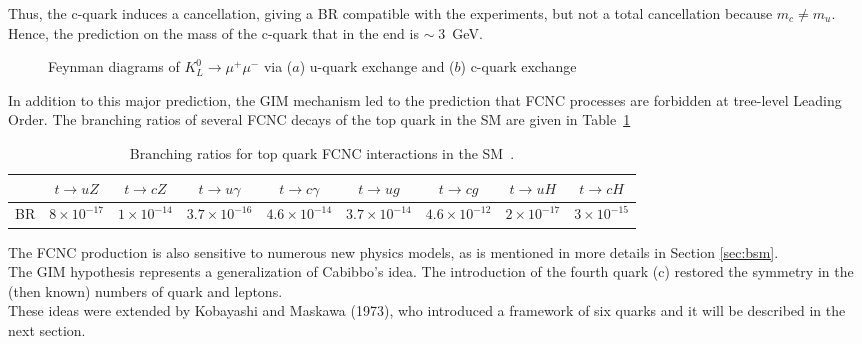 Thus, the c-quark induces a cancellation, giving a BR compatible with the experiments, but not a total cancellation because $m_{c}\neq m_{u}$. Hence, the prediction on the mass of the
c-quark that in the end is $\sim\; 3$~GeV.
\begin{figure}[h]
	\centering
		\qquad
	\caption{Feynman diagrams of $K^{0}_{L}\rightarrow \mu^{+} \mu^{-}$ via ($a$) u-quark exchange and ($b$) c-quark exchange}
\end{figure}
In addition to this major prediction, the GIM mechanism led to the prediction that FCNC processes are forbidden at tree-level Leading Order. The branching ratios of several FCNC decays of the top quark in the SM are given in Table~\ref{tab:SM_BR}
\begin{table}[h]
	\begin{adjustbox}{max width=1.\textwidth,center}
		\begin{tabular}{|c|c|c|c|c|c|c|c|c|}
		\hline 
  & $ t\rightarrow uZ$    & $ t\rightarrow cZ$    & $ t\rightarrow u\gamma$ & $ t\rightarrow c\gamma$ & $ t\rightarrow ug$       & $ t\rightarrow cg$       & $ t\rightarrow uH$     & $ t\rightarrow cH$  \\ 
	\hline 
	BR & $8\times 10^{-17} $ & $1\times 10^{-14} $ & $3.7\times 10^{-16} $       & $4.6\times 10^{-14} $      & $3.7\times 10^{-14} $  & $4.6\times 10^{-12} $ & $2\times 10^{-17} $  &$3\times 10^{-15} $  \\ 
		\hline 
		\end{tabular} 
	\end{adjustbox}
\caption{Branching ratios for top quark FCNC interactions in the SM~\cite{aguilar}.}
\label{tab:SM_BR}
\end{table}
\noindent The FCNC production is also sensitive to numerous new physics models, as is mentioned in more details in Section \ref{sec:bsm}.\\
The GIM hypothesis represents a generalization of Cabibbo's idea. The introduction of the fourth quark (c) restored the symmetry
in the (then known)  numbers of quark and leptons.\\
These ideas were extended by Kobayashi and Maskawa (1973), who introduced a framework of six quarks and it will be described in the next section.

